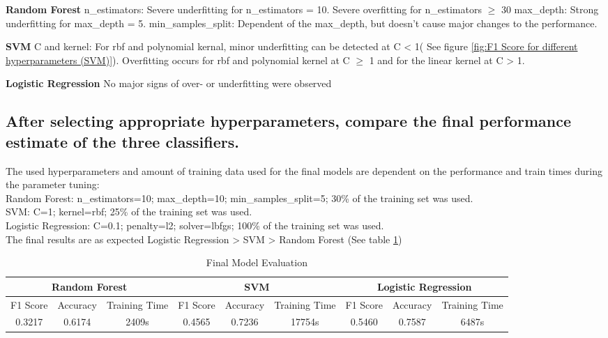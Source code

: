 \textbf{Random Forest} \quad
n\_estimators: Severe underfitting for  n\_estimators = 10. Severe overfitting for n\_estimators $\geq$ 30
max\_depth: Strong underfitting for max\_depth = 5.
min\_samples\_split: Dependent of the max\_depth, but doesn't cause major changes to the performance.

\textbf{SVM} \quad
C and kernel:  For rbf and polynomial kernal, minor underfitting can be detected at C < 1( See figure \ref{fig:F1 Score for different hyperparameters (SVM)}). Overfitting occurs for rbf and polynomial kernel at C $\geq$ 1 and for the linear kernel at C > 1.

\textbf{Logistic Regression} \quad
No major signs of over- or underfitting were observed

\subsection{After selecting appropriate hyperparameters, compare the final performance estimate of the three classifiers. }
\label{sec:Experiments:b}

The used hyperparameters and amount of training data used for the final models are dependent on the performance and train times during the parameter tuning:\\
Random Forest: n\_estimators=10; max\_depth=10; min\_samples\_split=5; 30\% of the training set was used.\\
SVM: C=1; kernel=rbf; 25\% of the training set was used.\\
Logistic Regression: C=0.1; penalty=l2; solver=lbfgs; 100\% of the training set was used.\\

The final results are as expected Logistic Regression > SVM > Random Forest (See table \ref{tab:Final Model Evaluation})
\begin{table}[htbp]
    \centering
    \begin{tabular}{ccccccccc}\toprule
         \multicolumn{3}{c}{Random Forest}&  \multicolumn{3}{c}{SVM}&  \multicolumn{3}{c}{Logistic Regression}\\\midrule
         F1 Score&  Accuracy&  Training Time&  F1 Score&  Accuracy&  Training Time&  F1 Score&  Accuracy& Training Time\\
         0.3217&  0.6174&  2409s&  0.4565&  0.7236&  17754s&  0.5460&  0.7587& 6487s\\ \bottomrule
    \end{tabular}
    \caption{Final Model Evaluation}
    \label{tab:Final Model Evaluation}
\end{table}
